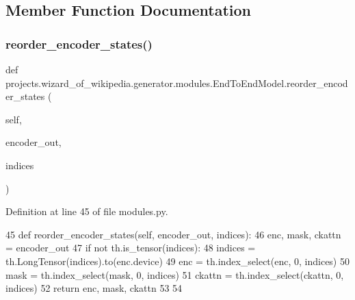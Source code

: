 \subsection{Member Function Documentation}
\mbox{\label{classprojects_1_1wizard__of__wikipedia_1_1generator_1_1modules_1_1EndToEndModel_a619ee6377355376fd7fe43779dc54bea}} 
\subsubsection{\texorpdfstring{reorder\+\_\+encoder\+\_\+states()}{reorder\_encoder\_states()}}
{\footnotesize\ttfamily def projects.\+wizard\+\_\+of\+\_\+wikipedia.\+generator.\+modules.\+End\+To\+End\+Model.\+reorder\+\_\+encoder\+\_\+states (\begin{DoxyParamCaption}\item[{}]{self,  }\item[{}]{encoder\+\_\+out,  }\item[{}]{indices }\end{DoxyParamCaption})}



Definition at line 45 of file modules.\+py.


\begin{DoxyCode}
45     \textcolor{keyword}{def }reorder\_encoder\_states(self, encoder\_out, indices):
46         enc, mask, ckattn = encoder\_out
47         \textcolor{keywordflow}{if} \textcolor{keywordflow}{not} th.is\_tensor(indices):
48             indices = th.LongTensor(indices).to(enc.device)
49         enc = th.index\_select(enc, 0, indices)
50         mask = th.index\_select(mask, 0, indices)
51         ckattn = th.index\_select(ckattn, 0, indices)
52         \textcolor{keywordflow}{return} enc, mask, ckattn
53 
54 
\end{DoxyCode}


